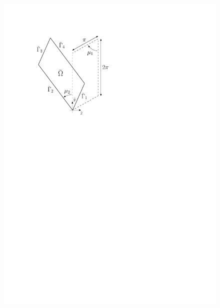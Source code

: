 \documentclass[12pt, a4paper, twoside, openright]{report}
\numberwithin{equation}{chapter}
\theoremstyle{theorem}
\theoremstyle{definition}
\theoremstyle{remark}
\theoremstyle{proposition}
\numberwithin{figure}{chapter}
\begin{document}
		\begin{figure}[t]
			\center
			\begin{minipage}{0.4\textwidth}
				\center
				\includegraphics[scale = 0.7]{domain_square}
			\end{minipage}
			\hfill
			\begin{minipage}{0.55\textwidth}
				\center

\end{minipage}
\end{figure}
\end{document}
